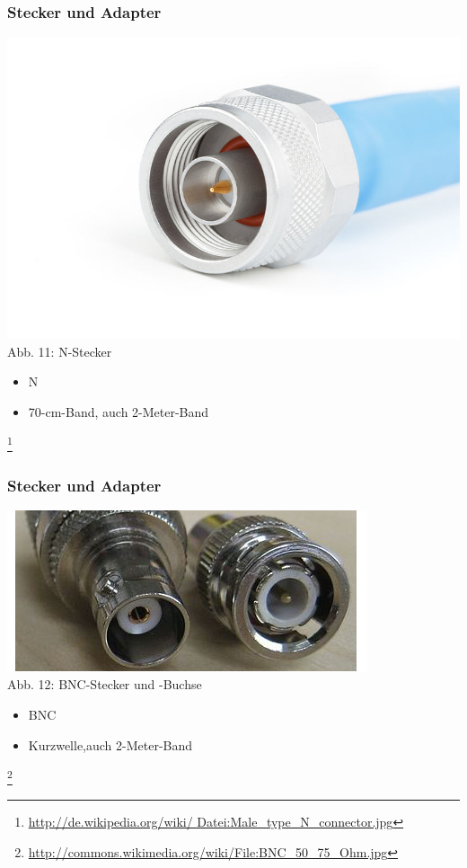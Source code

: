 \begin{frame}
\frametitle{Stecker und Adapter}
\begin{center}
	\includegraphics[scale=0.3]{e10/n.jpg}\\
	Abb. 11: N-Stecker
	\begin{itemize}
		\item N
		\item 70-cm-Band, auch 2-Meter-Band
	\end{itemize}	 
	\footnote{\url{http://de.wikipedia.org/wiki/	Datei:Male_type_N_connector.jpg}}
\end{center}
\end{frame}

\begin{frame}
\frametitle{Stecker und Adapter}
\begin{center}
	\includegraphics[scale=0.5]{e10/bnc.jpg}\\
	Abb. 12: BNC-Stecker und -Buchse
	\begin{itemize}
		\item BNC
		\item Kurzwelle,auch 2-Meter-Band
	\end{itemize}	
	\footnote{\url{http://commons.wikimedia.org/wiki/File:BNC_50_75_Ohm.jpg}}

\end{center}
\end{frame}

